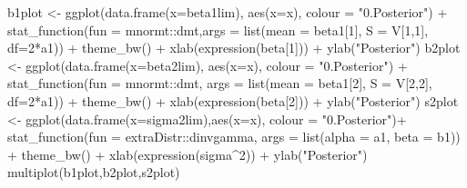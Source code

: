 \documentclass[
]{book}
\newenvironment{Shaded}{\begin{snugshade}}{\end{snugshade}}
\newcommand{\AttributeTok}[1]{\textcolor[rgb]{0.77,0.63,0.00}{#1}}
\newcommand{\DecValTok}[1]{\textcolor[rgb]{0.00,0.00,0.81}{#1}}
\newcommand{\FunctionTok}[1]{\textcolor[rgb]{0.00,0.00,0.00}{#1}}
\newcommand{\NormalTok}[1]{#1}
\newcommand{\OtherTok}[1]{\textcolor[rgb]{0.56,0.35,0.01}{#1}}
\newcommand{\SpecialCharTok}[1]{\textcolor[rgb]{0.00,0.00,0.00}{#1}}
\newcommand{\StringTok}[1]{\textcolor[rgb]{0.31,0.60,0.02}{#1}}
\begin{document}
\begin{Shaded}
\begin{Highlighting}[]
\NormalTok{b1plot }\OtherTok{\textless{}{-}} \FunctionTok{ggplot}\NormalTok{(}\FunctionTok{data.frame}\NormalTok{(}\AttributeTok{x=}\NormalTok{beta1lim), }\FunctionTok{aes}\NormalTok{(}\AttributeTok{x=}\NormalTok{x), }\AttributeTok{colour =} \StringTok{"0.Posterior"}\NormalTok{) }\SpecialCharTok{+}
  \FunctionTok{stat\_function}\NormalTok{(}\AttributeTok{fun =}\NormalTok{ mnormt}\SpecialCharTok{::}\NormalTok{dmt,}\AttributeTok{args =} \FunctionTok{list}\NormalTok{(}\AttributeTok{mean =}\NormalTok{ beta1[}\DecValTok{1}\NormalTok{], }\AttributeTok{S =}\NormalTok{ V[}\DecValTok{1}\NormalTok{,}\DecValTok{1}\NormalTok{], }\AttributeTok{df=}\DecValTok{2}\SpecialCharTok{*}\NormalTok{a1)) }\SpecialCharTok{+}
  \FunctionTok{theme\_bw}\NormalTok{() }\SpecialCharTok{+} \FunctionTok{xlab}\NormalTok{(}\FunctionTok{expression}\NormalTok{(beta[}\DecValTok{1}\NormalTok{])) }\SpecialCharTok{+} \FunctionTok{ylab}\NormalTok{(}\StringTok{"Posterior"}\NormalTok{)}
\NormalTok{b2plot }\OtherTok{\textless{}{-}} \FunctionTok{ggplot}\NormalTok{(}\FunctionTok{data.frame}\NormalTok{(}\AttributeTok{x=}\NormalTok{beta2lim), }\FunctionTok{aes}\NormalTok{(}\AttributeTok{x=}\NormalTok{x), }\AttributeTok{colour =} \StringTok{"0.Posterior"}\NormalTok{) }\SpecialCharTok{+}
  \FunctionTok{stat\_function}\NormalTok{(}\AttributeTok{fun =}\NormalTok{ mnormt}\SpecialCharTok{::}\NormalTok{dmt, }\AttributeTok{args =} \FunctionTok{list}\NormalTok{(}\AttributeTok{mean =}\NormalTok{ beta1[}\DecValTok{2}\NormalTok{], }\AttributeTok{S =}\NormalTok{ V[}\DecValTok{2}\NormalTok{,}\DecValTok{2}\NormalTok{], }\AttributeTok{df=}\DecValTok{2}\SpecialCharTok{*}\NormalTok{a1)) }\SpecialCharTok{+}
  \FunctionTok{theme\_bw}\NormalTok{() }\SpecialCharTok{+} \FunctionTok{xlab}\NormalTok{(}\FunctionTok{expression}\NormalTok{(beta[}\DecValTok{2}\NormalTok{])) }\SpecialCharTok{+} \FunctionTok{ylab}\NormalTok{(}\StringTok{"Posterior"}\NormalTok{)}
\NormalTok{s2plot }\OtherTok{\textless{}{-}} \FunctionTok{ggplot}\NormalTok{(}\FunctionTok{data.frame}\NormalTok{(}\AttributeTok{x=}\NormalTok{sigma2lim),}\FunctionTok{aes}\NormalTok{(}\AttributeTok{x=}\NormalTok{x), }\AttributeTok{colour =} \StringTok{"0.Posterior"}\NormalTok{)}\SpecialCharTok{+}
  \FunctionTok{stat\_function}\NormalTok{(}\AttributeTok{fun =}\NormalTok{ extraDistr}\SpecialCharTok{::}\NormalTok{dinvgamma, }\AttributeTok{args =} \FunctionTok{list}\NormalTok{(}\AttributeTok{alpha =}\NormalTok{ a1, }\AttributeTok{beta =}\NormalTok{ b1)) }\SpecialCharTok{+}
  \FunctionTok{theme\_bw}\NormalTok{() }\SpecialCharTok{+} \FunctionTok{xlab}\NormalTok{(}\FunctionTok{expression}\NormalTok{(sigma}\SpecialCharTok{\^{}}\DecValTok{2}\NormalTok{)) }\SpecialCharTok{+} \FunctionTok{ylab}\NormalTok{(}\StringTok{"Posterior"}\NormalTok{)}
\FunctionTok{multiplot}\NormalTok{(b1plot,b2plot,s2plot)}
\end{Highlighting}
\end{Shaded}
\end{document}
